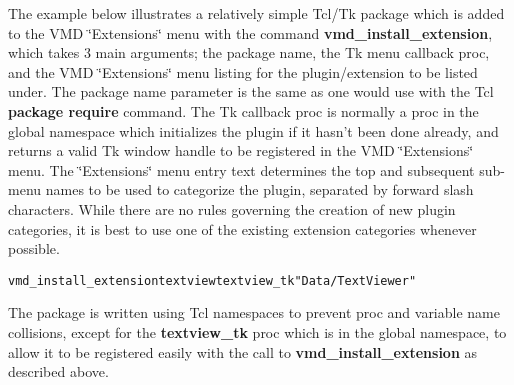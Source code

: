  The example below illustrates a relatively simple Tcl/Tk package which is added to the VMD \char`\"{}Extensions\char`\"{} menu with the command  {\bf vmd\_\-install\_\-extension}, which takes 3 main arguments; the package name, the Tk menu callback proc, and the VMD \char`\"{}Extensions\char`\"{} menu  listing for the plugin/extension to be listed under. The package name parameter is the same as one would use with the Tcl {\bf package require} command. The Tk callback proc is normally a proc in the global namespace which initializes the plugin if it hasn't been done already, and returns a valid Tk window handle to be registered in the VMD \char`\"{}Extensions\char`\"{} menu. The \char`\"{}Extensions\char`\"{} menu entry text determines the top and subsequent sub-menu names to be used to categorize the plugin, separated by forward slash characters.  While there are no rules governing the creation of new plugin  categories, it is best to use one of the existing extension categories whenever possible.



  \small\begin{alltt}
    vmd_install_extension textview textview_tk "Data/Text Viewer"
\end{alltt}\normalsize 




 The package is written using Tcl namespaces to prevent proc and variable name collisions, except for the {\bf textview\_\-tk} proc which is in the global namespace, to allow it to be registered easily with the call to {\bf vmd\_\-install\_\-extension} as described above.



